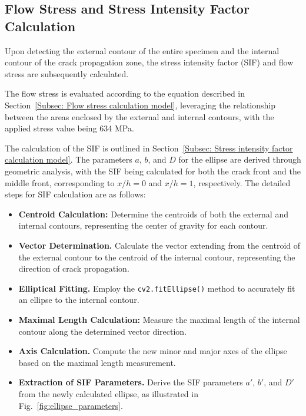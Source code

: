 \documentclass{ieeeaccess}
\begin{document}
\subsection{Flow Stress and Stress Intensity Factor Calculation}
\label{subsec:FlowStressSIFCalculation}
Upon detecting the external contour of the entire specimen and the internal contour of the crack propagation zone, the stress intensity factor (SIF) and flow stress are subsequently calculated.

The flow stress is evaluated according to the equation described in Section~\ref{Subsec: Flow stress calculation model}, leveraging the relationship between the areas enclosed by the external and internal contours, with the applied stress value being 634 MPa.

The calculation of the SIF is outlined in Section~\ref{Subsec: Stress intensity factor calculation model}. The parameters \(a\), \(b\), and \(D\) for the ellipse are derived through geometric analysis, with the SIF being calculated for both the crack front and the middle front, corresponding to \(x/h = 0\) and \(x/h = 1\), respectively.
The detailed steps for SIF calculation are as follows:

\begin{itemize}
    \item \textbf{Centroid Calculation:} Determine the centroids of both the external and internal contours, representing the center of gravity for each contour.
    \item \textbf{Vector Determination.} Calculate the vector extending from the centroid of the external contour to the centroid of the internal contour, representing the direction of crack propagation.
    \item \textbf{Elliptical Fitting.} Employ the \texttt{cv2.fitEllipse()} method to accurately fit an ellipse to the internal contour.
    \item \textbf{Maximal Length Calculation:} Measure the maximal length of the internal contour along the determined vector direction.
    \item \textbf{Axis Calculation.} Compute the new minor and major axes of the ellipse based on the maximal length measurement.
    \item \textbf{Extraction of SIF Parameters.} Derive the SIF parameters \(a'\), \(b'\), and \(D'\) from the newly calculated ellipse, as illustrated in Fig.~\ref{fig:ellipse_parameters}.
\end{itemize}
\end{document}
